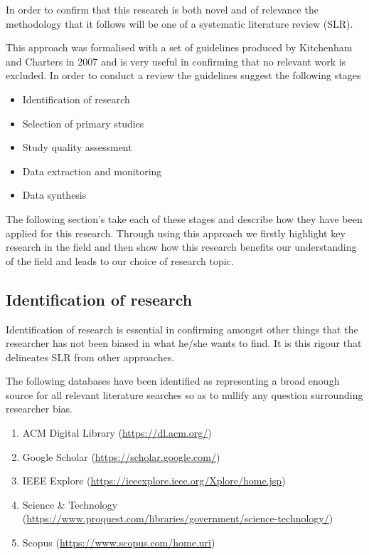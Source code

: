 \noindent
In order to confirm that this research is both novel and of relevance the methodology that it follows will be one of a systematic literature review (SLR).
\par
This approach was formalised with a set of guidelines produced by Kitchenham and Charters in 2007 and is very useful in confirming that no relevant work is excluded. In order to conduct a review the guidelines suggest the following stages

\begin{itemize}
  \item Identification of research %
  \item Selection of primary studies %
  \item Study quality assessment %
  \item Data extraction and monitoring %
  \item Data synthesis %
\end{itemize}

\noindent
The following section's take each of these stages and describe how they have been applied for this research. Through using this approach we firstly highlight key research in the field and then show how this research benefits our understanding of the field and leads to our choice of research topic.


\subsection{Identification of research}
Identification of research is essential in confirming amongst other things that the researcher has not been biased in what he/she wants to find. It is this rigour that delineates SLR from other approaches.
\par
The following databases have been identified as representing a broad enough source for all relevant literature searches so as to nullify any question surrounding researcher bias.

\begin{enumerate}
  \item ACM Digital Library (\href{https://dl.acm.org/}{https://dl.acm.org/})
  \item Google Scholar (\href{https://scholar.google.com/}{https://scholar.google.com/})
  \item IEEE Explore (\href{https://ieeexplore.ieee.org/Xplore/home.jsp}{https://ieeexplore.ieee.org/Xplore/home.jsp})
  \item Science \& Technology\\ (\href{https://www.proquest.com/libraries/government/science-technology/}{https://www.proquest.com/libraries/government/science-technology/})
  \item Scopus (\href{https://www.scopus.com/home.uri}{https://www.scopus.com/home.uri})
\end{enumerate}

